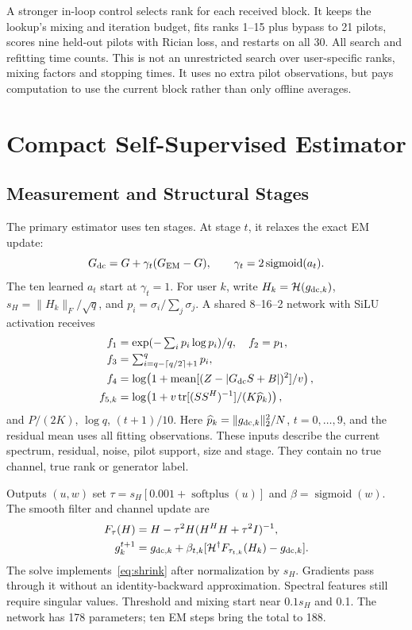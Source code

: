\documentclass[10pt,journal,letterpaper]{IEEEtran}
\newcommand{\HH}{\mathcal{H}}
\DeclareMathOperator{\tr}{tr}
\DeclareMathOperator{\sigmoid}{sigmoid}
\DeclareMathOperator{\softplus}{softplus}
\begin{document}
A stronger in-loop control selects rank for each received block. It keeps the lookup's mixing and iteration budget, fits ranks 1--15 plus bypass to 21 pilots, scores nine held-out pilots with Rician loss, and restarts on all 30. All search and refitting time counts. This is not an unrestricted search over user-specific ranks, mixing factors and stopping times. It uses no extra pilot observations, but pays computation to use the current block rather than only offline averages.

\section{Compact Self-Supervised Estimator}
\subsection{Measurement and Structural Stages}
The primary estimator uses ten stages. At stage $t$, it relaxes the exact EM update:
\begin{equation}
 G_{\rm dc}=G+\gamma_t(G_{\rm EM}-G),\qquad
 \gamma_t=2\sigmoid(a_t).
\end{equation}
The ten learned $a_t$ start at $\gamma_t=1$. For user $k$, write $H_k=\HH(g_{{\rm dc},k})$, $s_H=\|H_k\|_F/\sqrt q$, and $p_i=\sigma_i/\sum_j\sigma_j$. A shared 8--16--2 network with SiLU activation receives
\begin{align}
 f_1&=\exp(-\textstyle\sum_i p_i\log p_i)/q,\quad f_2=p_1,\nonumber\\
 f_3&=\textstyle\sum_{i=q-\lceil q/2\rceil+1}^q p_i,\nonumber\\
 f_4&=\log\!\left(1+\operatorname{mean}[(Z-|G_{\rm dc}S+B|)^2]/v\right),\nonumber\\
 f_{5,k}&=\log\!\left(1+v\tr[(SS^H)^{-1}]/(K\widehat p_k)\right),
 \label{eq:features}
\end{align}
and $P/(2K)$, $\log q$, $(t+1)/10$. Here $\widehat p_k=\|g_{{\rm dc},k}\|_2^2/N$, $t=0,\ldots,9$, and the residual mean uses all fitting observations. These inputs describe the current spectrum, residual, noise, pilot support, size and stage. They contain no true channel, true rank or generator label.

Outputs $(u,w)$ set $\tau=s_H[0.001+\softplus(u)]$ and $\beta=\sigmoid(w)$. The smooth filter and channel update are
\begin{align}
 F_\tau(H)&=H-\tau^2H(H^HH+\tau^2I)^{-1},\label{eq:solve}\\
 g_k^{t+1}&=g_{{\rm dc},k}+\beta_{t,k}
 [\HH^\dagger F_{\tau_{t,k}}(H_k)-g_{{\rm dc},k}].
\end{align}
The solve implements~\eqref{eq:shrink} after normalization by $s_H$. Gradients pass through it without an identity-backward approximation. Spectral features still require singular values. Threshold and mixing start near $0.1s_H$ and 0.1. The network has 178 parameters; ten EM steps bring the total to 188.
\end{document}
